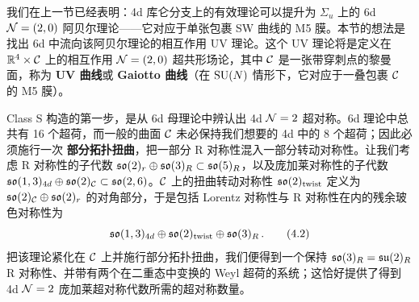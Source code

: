 
我们在上一节已经表明：4d 库仑分支上的有效理论可以提升为 $\Sigma_u$ 上的 6d $\mathcal{N}=(2,0)$ 阿贝尔理论——它对应于单张包裹 SW 曲线的 M5 膜。本节的想法是找出 6d 中流向该阿贝尔理论的相互作用 UV 理论。这个 UV 理论将是定义在 $\mathbb{R}^4\times\mathcal{C}$ 上的相互作用 $\mathcal{N}=(2,0)$ 超共形场论，其中 $\mathcal{C}$ 是一张带穿刺点的黎曼面，称为 \textbf{UV 曲线}或 \textbf{Gaiotto 曲线}（在 $\mathrm{SU}(N)$ 情形下，它对应于一叠包裹 $\mathcal{C}$ 的 M5 膜）。

Class S 构造的第一步，是从 6d 母理论中辨认出 4d $\mathcal{N}=2$ 超对称。6d 理论中总共有 16 个超荷，而一般的曲面 $\mathcal{C}$ 未必保持我们想要的 4d 中的 8 个超荷；因此必须施行一次 \textbf{部分拓扑扭曲}，把一部分 R 对称性混入一部分转动对称性。让我们考虑 R 对称性的子代数 $\mathfrak{so}(2)_r\oplus\mathfrak{so}(3)_R\subset\mathfrak{so}(5)_R$，以及庞加莱对称性的子代数 $\mathfrak{so}(1,3)_{4d}\oplus\mathfrak{so}(2)_{\mathcal{C}}\subset\mathfrak{so}(2,6)$。$\mathcal{C}$ 上的扭曲转动对称性 $\mathfrak{so}(2)_{\mathrm{twist}}$ 定义为 $\mathfrak{so}(2)_{\mathcal{C}}\oplus\mathfrak{so}(2)_r$ 的对角部分，于是包括 Lorentz 对称性与 R 对称性在内的残余玻色对称性为
\begin{equation}
  \mathfrak{so}(1,3)_{4d}\oplus\mathfrak{so}(2)_{\mathrm{twist}}\oplus\mathfrak{so}(3)_R\,.
  \tag{4.2}
\end{equation}
把该理论紧化在 $\mathcal{C}$ 上并施行部分拓扑扭曲，我们便得到一个保持 $\mathfrak{so}(3)_R=\mathfrak{su}(2)_R$ R 对称性、并带有两个在二重态中变换的 Weyl 超荷的系统；这恰好提供了得到 4d $\mathcal{N}=2$ 庞加莱超对称代数所需的超对称数量。

